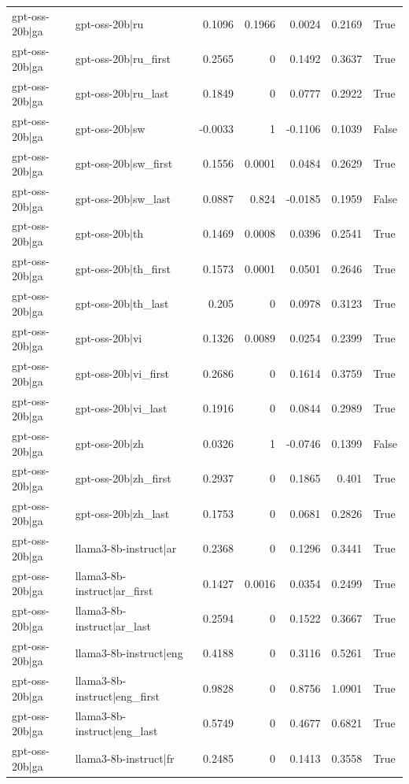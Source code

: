 \begin{table}
\begin{tabular}{l l r r r r l}
gpt-oss-20b|ga & gpt-oss-20b|ru & 0.1096 & 0.1966 & 0.0024 & 0.2169 & True \\
gpt-oss-20b|ga & gpt-oss-20b|ru_first & 0.2565 & 0 & 0.1492 & 0.3637 & True \\
gpt-oss-20b|ga & gpt-oss-20b|ru_last & 0.1849 & 0 & 0.0777 & 0.2922 & True \\
gpt-oss-20b|ga & gpt-oss-20b|sw & -0.0033 & 1 & -0.1106 & 0.1039 & False \\
gpt-oss-20b|ga & gpt-oss-20b|sw_first & 0.1556 & 0.0001 & 0.0484 & 0.2629 & True \\
gpt-oss-20b|ga & gpt-oss-20b|sw_last & 0.0887 & 0.824 & -0.0185 & 0.1959 & False \\
gpt-oss-20b|ga & gpt-oss-20b|th & 0.1469 & 0.0008 & 0.0396 & 0.2541 & True \\
gpt-oss-20b|ga & gpt-oss-20b|th_first & 0.1573 & 0.0001 & 0.0501 & 0.2646 & True \\
gpt-oss-20b|ga & gpt-oss-20b|th_last & 0.205 & 0 & 0.0978 & 0.3123 & True \\
gpt-oss-20b|ga & gpt-oss-20b|vi & 0.1326 & 0.0089 & 0.0254 & 0.2399 & True \\
gpt-oss-20b|ga & gpt-oss-20b|vi_first & 0.2686 & 0 & 0.1614 & 0.3759 & True \\
gpt-oss-20b|ga & gpt-oss-20b|vi_last & 0.1916 & 0 & 0.0844 & 0.2989 & True \\
gpt-oss-20b|ga & gpt-oss-20b|zh & 0.0326 & 1 & -0.0746 & 0.1399 & False \\
gpt-oss-20b|ga & gpt-oss-20b|zh_first & 0.2937 & 0 & 0.1865 & 0.401 & True \\
gpt-oss-20b|ga & gpt-oss-20b|zh_last & 0.1753 & 0 & 0.0681 & 0.2826 & True \\
gpt-oss-20b|ga & llama3-8b-instruct|ar & 0.2368 & 0 & 0.1296 & 0.3441 & True \\
gpt-oss-20b|ga & llama3-8b-instruct|ar_first & 0.1427 & 0.0016 & 0.0354 & 0.2499 & True \\
gpt-oss-20b|ga & llama3-8b-instruct|ar_last & 0.2594 & 0 & 0.1522 & 0.3667 & True \\
gpt-oss-20b|ga & llama3-8b-instruct|eng & 0.4188 & 0 & 0.3116 & 0.5261 & True \\
gpt-oss-20b|ga & llama3-8b-instruct|eng_first & 0.9828 & 0 & 0.8756 & 1.0901 & True \\
gpt-oss-20b|ga & llama3-8b-instruct|eng_last & 0.5749 & 0 & 0.4677 & 0.6821 & True \\
gpt-oss-20b|ga & llama3-8b-instruct|fr & 0.2485 & 0 & 0.1413 & 0.3558 & True \\

\end{tabular}
\end{table}
